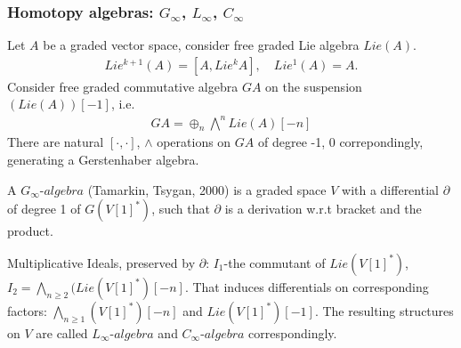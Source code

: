 \documentclass[9pt]{beamer}
\newcommand{\p}{\partial}
\begin{document}
\begin{frame}[t]
\frametitle{Homotopy algebras: $G_{\infty}$, $L_{\infty}$, $C_{\infty}$}
Let $A$ be a graded vector space, consider free graded Lie algebra $Lie (A)$. 
\begin{eqnarray*}
Lie^{k+1}(A)=[A,Lie^{k}A], \quad Lie^{1}(A)=A.
\end{eqnarray*}
Consider free graded commutative algebra $GA$ on the suspension $(Lie(A))[-1]$, i.e. 
\begin{eqnarray*}
GA=\oplus_n{\bigwedge}^n Lie (A)[-n]
\end{eqnarray*}
There are natural $[\cdot, \cdot]$, $\wedge$ 
operations on $GA$ of degree -1, 0 correpondingly, generating a Gerstenhaber algebra.\\

\vspace*{3mm} 

A $G_{\infty}$-$algebra$ (Tamarkin, Tsygan, 2000) is a graded space $V$ with a differential $\partial$ of degree 1 of $G(V[1]^*)$, such that $\p$ is a derivation w.r.t bracket and the product.\\

\vspace*{3mm}

Multiplicative Ideals, preserved by $\p$: $I_1$-the commutant of $Lie(V[1]^*)$, $I_2=\bigwedge_{n\ge 2} (Lie(V[1]^*)[-n]$. That induces differentials on corresponding factors: $\bigwedge_{n\ge 1}(V[1]^*)[-n]$ and $Lie(V[1]^*)[-1]$. The resulting structures on $V$ are called $L_{\infty}$-$algebra$ and $C_{\infty}$-$algebra$ correspondingly.

\end{frame}
\end{document}
